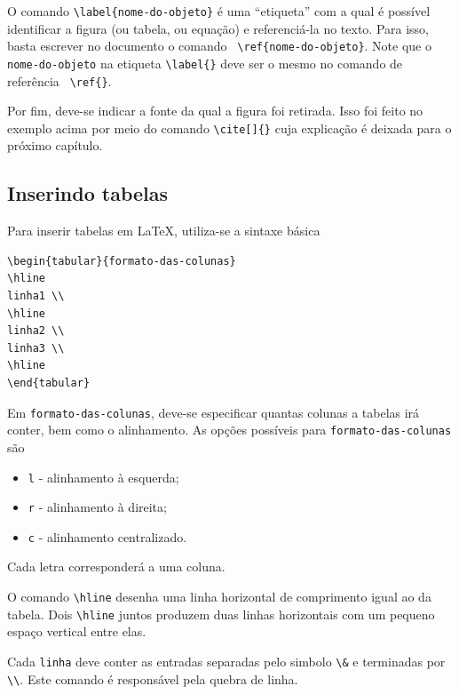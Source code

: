 O comando \verb!\label{nome-do-objeto}! é uma ``etiqueta'' com a qual é possível identificar a figura (ou tabela, ou equação) e referenciá-la no texto. Para isso, basta escrever no documento o comando \verb! \ref{nome-do-objeto}!. Note que o \texttt{nome-do-objeto} na etiqueta \verb!\label{}! deve ser o mesmo no comando de referência \verb! \ref{}!.

Por fim, deve-se indicar a fonte da qual a figura foi retirada. Isso foi feito no exemplo acima por meio do comando \verb!\cite[]{}! cuja explicação é deixada para o próximo capítulo.


\subsection{Inserindo tabelas}

Para inserir tabelas em LaTeX, utiliza-se a sintaxe básica
\begin{verbatim}
\begin{tabular}{formato-das-colunas}
\hline
linha1 \\
\hline
linha2 \\
linha3 \\
\hline
\end{tabular}
\end{verbatim}

Em \texttt{formato-das-colunas}, deve-se especificar quantas colunas a tabelas irá conter, bem como o alinhamento. As opções possíveis para \texttt{formato-das-colunas} são
\begin{itemize}
	\item \texttt{l} - alinhamento à esquerda;
	\item \texttt{r} - alinhamento à direita;
	\item \texttt{c} - alinhamento centralizado.
\end{itemize}

Cada letra corresponderá a uma coluna.

O comando \verb!\hline! desenha uma linha horizontal de comprimento igual ao da tabela. Dois \verb!\hline! juntos produzem duas linhas horizontais com um pequeno espaço vertical entre elas.

Cada \texttt{linha} deve conter as entradas separadas pelo simbolo \verb!\&!  e terminadas por \verb!\\!. Este comando é responsável pela quebra de linha.

